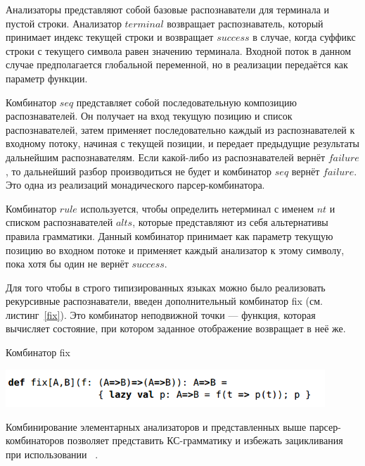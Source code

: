 Анализаторы представляют собой базовые распознаватели для терминала и пустой строки. Анализатор $terminal$ возвращает распознаватель, который принимает индекс текущей строки и возвращает $success$ в случае, когда суффикс строки с текущего символа равен значению терминала. Входной поток в данном случае предполагается глобальной переменной, но в реализации передаётся как параметр функции. 

Комбинатор $seq$ представляет собой последовательную композицию распознавателей. Он получает на вход текущую позицию и список распознавателей, затем применяет последовательно каждый из распознавателей к входному потоку, начиная с текущей позиции, и передает предыдущие результаты дальнейшим распознавателям. Если какой-либо из распознавателей вернёт $failure$, то дальнейший разбор производиться не будет и комбинатор $seq$ вернёт $failure$. Это одна из реализаций монадического
парсер-комбинатора.

 Комбинатор $rule$ используется, чтобы определить нетерминал с именем $nt$ и списком распознавателей $alts$, которые представляют из себя альтернативы правила грамматики. Данный комбинатор принимает как параметр текущую позицию во входном потоке и применяет каждый анализатор к этому символу, пока хотя бы один не вернёт $success$. 

Для того чтобы в строго типизированных языках можно было реализовать рекурсивные распознаватели, введен дополнительный комбинатор fix (см. листинг~\ref{fix}). Это комбинатор неподвижной точки — функция, которая вычисляет состояние, при котором заданное отображение возвращает в неё же.

\begin{listing}
\caption{Комбинатор fix}
\label{fix}
\centering
\includegraphics[width=0.9\textwidth]{Smolina/pics/fix.png}
\end{listing} 

Комбинирование элементарных анализаторов и представленных выше парсер-комбинаторов позволяет представить КС-грамматику и избежать зацикливания при использовании ~\cite{GLL}.

